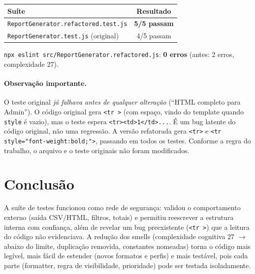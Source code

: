 \documentclass[12pt,a4paper]{article}
\begin{document}
\begin{center}
\begin{tabular}{@{}lc@{}}
\toprule
Suíte & Resultado \\
\midrule
\texttt{ReportGenerator.refactored.test.js} & \textbf{5/5 passam} \\
\texttt{ReportGenerator.test.js} (original) & 4/5 passam \\
\bottomrule
\end{tabular}
\end{center}

\texttt{npx eslint src/ReportGenerator.refactored.js}: \textbf{0 erros} (antes: 2 erros, complexidade 27).

\paragraph{Observação importante.} O teste original \emph{já falhava antes de qualquer alteração} (``HTML completo para Admin''). O código original gera \texttt{<tr >} (com espaço, vindo do template quando \texttt{style} é vazio), mas o teste espera \texttt{<tr><td>1</td>...}. É um bug latente do código original, não uma regressão. A versão refatorada gera \texttt{<tr>} e \texttt{<tr style="font-weight:bold;">}, passando em todos os testes. Conforme a regra do trabalho, o arquivo e o teste originais não foram modificados.

\section{Conclusão}
A suíte de testes funcionou como rede de segurança: validou o comportamento externo (saída CSV/HTML, filtros, totais) e permitiu reescrever a estrutura interna com confiança, além de revelar um bug preexistente (\texttt{<tr >}) que a leitura do código não evidenciava. A redução dos smells (complexidade cognitiva 27 $\to$ abaixo do limite, duplicação removida, constantes nomeadas) torna o código mais legível, mais fácil de estender (novos formatos e perfis) e mais testável, pois cada parte (formatter, regra de visibilidade, prioridade) pode ser testada isoladamente.
\end{document}
